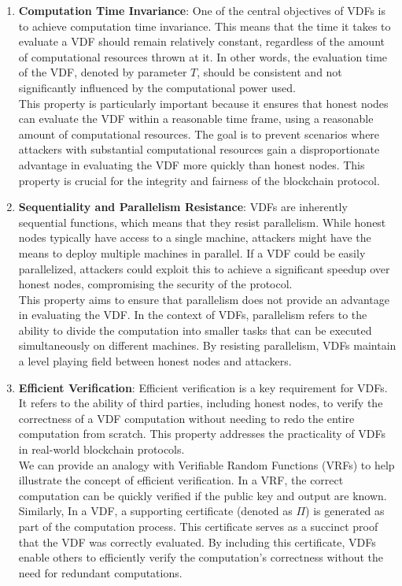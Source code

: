 \begin{enumerate}[label=\arabic*.]
    \item \textbf{Computation Time Invariance}: One of the central objectives of VDFs is to achieve computation time invariance. This means that the time it takes to evaluate a VDF should remain relatively constant, regardless of the amount of computational resources thrown at it. In other words, the evaluation time of the VDF, denoted by parameter $T$, should be consistent and not significantly influenced by the computational power used.\\
    This property is particularly important because it ensures that honest nodes can evaluate the VDF within a reasonable time frame, using a reasonable amount of computational resources. The goal is to prevent scenarios where attackers with substantial computational resources gain a disproportionate advantage in evaluating the VDF more quickly than honest nodes. This property is crucial for the integrity and fairness of the blockchain protocol.

    \item \textbf{Sequentiality and Parallelism Resistance}: VDFs are inherently sequential functions, which means that they resist parallelism. While honest nodes typically have access to a single machine, attackers might have the means to deploy multiple machines in parallel. If a VDF could be easily parallelized, attackers could exploit this to achieve a significant speedup over honest nodes, compromising the security of the protocol.\\
    This property aims to ensure that parallelism does not provide an advantage in evaluating the VDF. In the context of VDFs, parallelism refers to the ability to divide the computation into smaller tasks that can be executed simultaneously on different machines. By resisting parallelism, VDFs maintain a level playing field between honest nodes and attackers.

    \item \textbf{Efficient Verification}: Efficient verification is a key requirement for VDFs. It refers to the ability of third parties, including honest nodes, to verify the correctness of a VDF computation without needing to redo the entire computation from scratch. This property addresses the practicality of VDFs in real-world blockchain protocols.\\
    We can provide an analogy with Verifiable Random Functions (VRFs) to help illustrate the concept of efficient verification. In a VRF, the correct computation can be quickly verified if the public key and output are known. Similarly, In a VDF, a supporting certificate (denoted as $\Pi$) is generated as part of the computation process. This certificate serves as a succinct proof that the VDF was correctly evaluated. By including this certificate, VDFs enable others to efficiently verify the computation's correctness without the need for redundant computations.\\
\end{enumerate}
